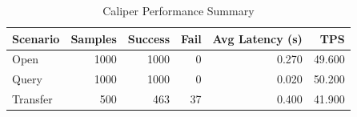\begin{table}
\caption{Caliper Performance Summary}
\label{tab:caliper_round}
\begin{tabular}{lrrrrr}
\toprule
Scenario & Samples & Success & Fail & Avg Latency (s) & TPS \\
\midrule
Open & 1000 & 1000 & 0 & 0.270 & 49.600 \\
Query & 1000 & 1000 & 0 & 0.020 & 50.200 \\
Transfer & 500 & 463 & 37 & 0.400 & 41.900 \\
\bottomrule
\end{tabular}
\end{table}
